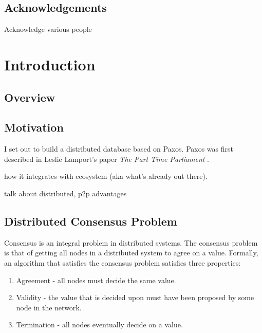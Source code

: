 \documentclass[12pt,twoside,notitlepage]{report}
\begin{document}
\tableofcontents

\listoffigures

\newpage
\section*{Acknowledgements}

Acknowledge various people


\cleardoublepage        %

\setcounter{page}{1}
\pagestyle{headings}

\chapter{Introduction}

\section{Overview}

\section{Motivation}

I set out to build a distributed database based on Paxos. Paxos was first described in Leslie
Lamport's paper \emph{The Part Time Parliament} \cite{lamport98}.

how it integrates with ecosystem (aka what's already out there).


talk about distributed, p2p advantages


\section{Distributed Consensus Problem}

Consensus is an integral problem in distributed systems. The consensus problem is that of getting
all nodes in a distributed system to agree on a value. Formally, an algorithm that satisfies the
consensus problem satisfies three properties:

\begin{enumerate}
\item Agreement - all nodes must decide the same value.
\item Validity - the value that is decided upon must have been proposed by some node in the
	network.
\item Termination - all nodes eventually decide on a value.
\end{enumerate}
\end{document}
